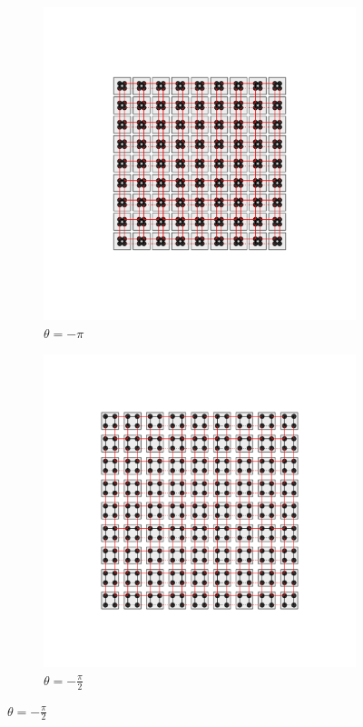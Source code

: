 \begin{figure}[thb!]
     \centering
    \captionsetup[sub]{font=small}
     \begin{minipage}[h!]{0.9\textwidth}
         \begin{subfigure}[b!]{0.2 \textwidth}
             \caption{$\theta = - \pi$}
             \includegraphics[width=\textwidth]{Imagenes/Models/Model_pump/square_pump_model_xy_0.pdf}
         \end{subfigure}\hspace*{-0.5em}
         \begin{subfigure}[b!]{0.2 \textwidth}
             \caption*{$\theta = -\frac{\pi}{2}$}
             \includegraphics[width=\textwidth]{Imagenes/Models/Model_pump/square_pump_model_xy_5.pdf}

\end{subfigure}
\end{minipage}
\end{figure}

